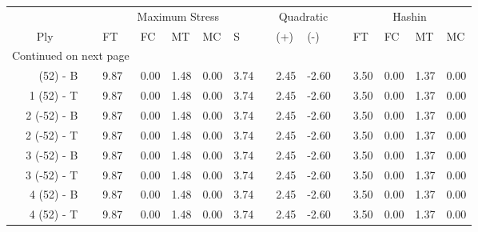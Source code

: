 \begin{table}[H]
\centering
\begin{longtable}{@{}rllllllllllllll@{}}
\toprule       
 & \phantom{a} &\multicolumn{5}{c}{Maximum Stress} & \phantom{a} & \multicolumn{2}{c}{Quadratic} & 
\phantom{a} & \multicolumn{4}{c}{Hashin}\\
\cmidrule{3-7} \cmidrule{9-10} \cmidrule{12-15}
  
         \multicolumn{1}{c}{Ply} &&  FT &  FC &  MT &  MC &      S &&  (+) &   (-) &&  FT &  FC &  MT &  MC \\
\midrule
\endhead
\midrule
\multicolumn{3}{r}{{Continued on next page}} \\
\midrule
\endfoot

\bottomrule
\endlastfoot
  1 (52) - B &&    9.87 &    0.00 &    1.48 &    0.00 & 3.74 && 2.45 & -2.60 &&     3.50 &     0.00 &     1.37 &     0.00 \\
  1 (52) - T &&    9.87 &    0.00 &    1.48 &    0.00 & 3.74 && 2.45 & -2.60 &&     3.50 &     0.00 &     1.37 &     0.00 \\\midrule
 2 (-52) - B &&    9.87 &    0.00 &    1.48 &    0.00 & 3.74 && 2.45 & -2.60 &&     3.50 &     0.00 &     1.37 &     0.00 \\
 2 (-52) - T &&    9.87 &    0.00 &    1.48 &    0.00 & 3.74 && 2.45 & -2.60 &&     3.50 &     0.00 &     1.37 &     0.00 \\\midrule
 3 (-52) - B &&    9.87 &    0.00 &    1.48 &    0.00 & 3.74 && 2.45 & -2.60 &&     3.50 &     0.00 &     1.37 &     0.00 \\
 3 (-52) - T &&    9.87 &    0.00 &    1.48 &    0.00 & 3.74 && 2.45 & -2.60 &&     3.50 &     0.00 &     1.37 &     0.00 \\\midrule
  4 (52) - B &&    9.87 &    0.00 &    1.48 &    0.00 & 3.74 && 2.45 & -2.60 &&     3.50 &     0.00 &     1.37 &     0.00 \\
  4 (52) - T &&    9.87 &    0.00 &    1.48 &    0.00 & 3.74 && 2.45 & -2.60 &&     3.50 &     0.00 &     1.37 &     0.00 \\\midrule
\end{longtable}
\end{table}